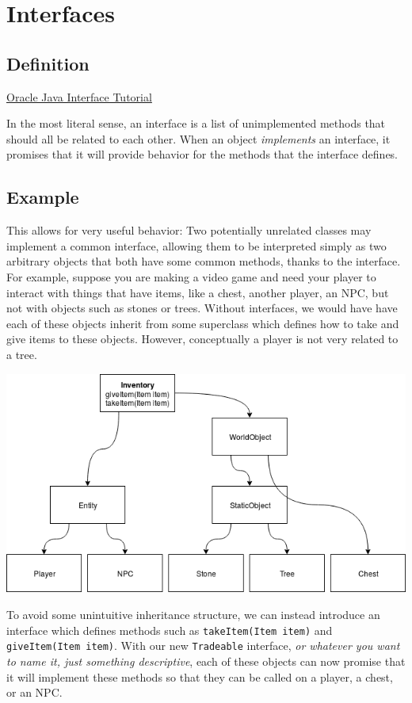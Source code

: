 \documentclass{article}
\begin{document}
    \newpage

    \section{Interfaces}
    	\subsection{Definition}
    		\href{https://docs.oracle.com/javase/tutorial/java/concepts/interface.html}{Oracle Java Interface Tutorial}

    		In the most literal sense, an interface is a list of unimplemented methods that should all be related to each other. When an object \textit{implements} an interface, it promises that it will provide behavior for the methods that the interface defines.

    	\subsection{Example}
    		This allows for very useful behavior: Two potentially unrelated classes may implement a common interface, allowing them to be interpreted simply as two arbitrary objects that both have some common methods, thanks to the interface. For example, suppose you are making a video game and need your player to interact with things that have items, like a chest, another player, an NPC, but not with objects such as stones or trees. Without interfaces, we would have have each of these objects inherit from some superclass which defines how to take and give items to these objects. However, conceptually a player is not very related to a tree.

    		\includegraphics[width=\textwidth]{images/interfaces/classesWithSuperclass.png}

    		To avoid some unintuitive inheritance structure, we can instead introduce an interface which defines methods such as \verb|takeItem(Item item)| and \verb|giveItem(Item item)|. With our new \verb|Tradeable| interface, \textit{or whatever you want to name it, just something descriptive}, each of these objects can now promise that it will implement these methods so that they can be called on a player, a chest, or an NPC.
\end{document}
